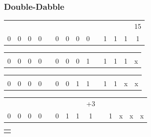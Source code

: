 \documentclass[table]{beamer}
\begin{document}
	\begin{frame}
		\frametitle{Double-Dabble}

		{\begin{center}
			\def\arraystretch{1.5}
			\begin{tabular}{|c|c|c|c|c|c|c|c|c|c|c|c|c|c|}
				\multicolumn{13}{c}{}&\multicolumn{1}{c}{15}\\
				\cline{1-4} \cline{6-9} \cline{11-14}
				0&0&0&0&&0&0&0&0&&1&1&1&1\\
				\cline{1-4} \cline{6-9} \cline{11-14}
			\end{tabular}
		\end{center}}
		\only<2>
		{\begin{center}
			\def\arraystretch{1.5}
			\begin{tabular}{|c|c|c|c|c|c|c|c|c|c|c|c|c|c|}
				\multicolumn{14}{c}{}\\
				\cline{1-4} \cline{6-9} \cline{11-14}
				0&0&0&0&&0&0&0&1&&1&1&1&\cellcolor{black!50}x\\
				\cline{1-4} \cline{6-9} \cline{11-14}
			\end{tabular}
		\end{center}}
		\only<3>
		{\begin{center}
			\def\arraystretch{1.5}
			\begin{tabular}{|c|c|c|c|c|c|c|c|c|c|c|c|c|c|}
				\multicolumn{14}{c}{}\\
				\cline{1-4} \cline{6-9} \cline{11-14}
				0&0&0&0&&0&0&1&1&&1&1&\cellcolor{black!50}x&\cellcolor{black!50}x\\
				\cline{1-4} \cline{6-9} \cline{11-14}
			\end{tabular}
		\end{center}}
		\only<4>
		{\begin{center}
			\def\arraystretch{1.5}
			\begin{tabular}{|c|c|c|c|c|c|c|c|c|c|c|c|c|c|}
				\multicolumn{8}{c}{}&\multicolumn{1}{c}{+3}&\multicolumn{4}{c}{}\\
				\cline{1-4} \cline{6-9} \cline{11-14}
				0&0&0&0&&0&1&1&1&&1&\cellcolor{black!50}x&\cellcolor{black!50}x&\cellcolor{black!50}x\\
				\cline{1-4} \cline{6-9} \cline{11-14}
			\end{tabular}
		\end{center}}
		{\begin{center}
			\def\arraystretch{1.5}
			\begin{tabular}{|c|c|c|c|c|c|c|c|c|c|c|c|c|c|}
				\multicolumn{14}{c}{}\\

\end{tabular}
\end{center}}
\end{frame}
\end{document}
